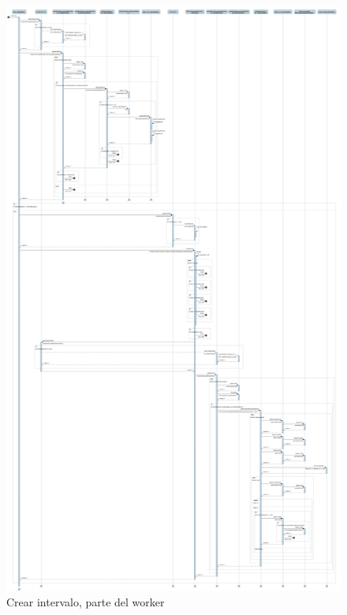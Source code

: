 \begin{figure}[H]
    \centering
    \includegraphics[width=0.8\linewidth]{./Figures/Secuencia/CreateIntervalWorker}
    \caption{Crear intervalo, parte del worker}
    \label{fig:CreateIntervalWorker}
\end{figure}


